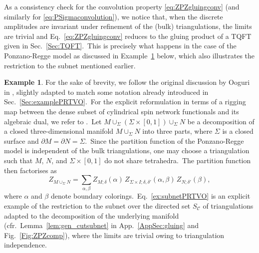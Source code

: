 \documentclass[11pt]{article}
\theoremstyle{definition}
\newtheorem{example}[proposition]{Example}
\numberwithin{equation}{section}
\begin{document}
As a consistency check for the convolution property \eqref{eq:ZPZgluingconv} (and similarly for \eqref{eq:PSigmaconvolution}), we notice that, when the discrete amplitudes are invariant under refinement of the (bulk) triangulations, the limits are trivial and Eq.~\eqref{eq:ZPZgluingconv} reduces to the gluing product of a TQFT given in Sec.~\ref{Sec:TQFT}.~This is precisely what happens in the case of the Ponzano-Regge model as discussed in Example~\ref{Ex:PRTVO2} below, which also illustrates the restriction to the subnet mentioned earlier.

\begin{example}\label{Ex:PRTVO2}
For the sake of brevity, we follow the original discussion by Ooguri in \cite{Ooguri:1991ib,Ooguri_1992a}, slightly adapted to match some notation already introduced in Sec.~\ref{Sec:examplePRTVO}.~For the explicit reformulation in terms of a rigging map between the dense subset of cylindrical spin network functionals and its algebraic dual, we refer to \cite{Noui_Perez_2005}.~Let $M \cup_{\Sigma} (\Sigma\times[0,1]) \cup_{\Sigma} N$ be a decomposition of a closed three-dimensional manifold $M\cup_{\Sigma}N$ into three parts, where $\Sigma$ is a closed surface and $\partial M = \partial N = \Sigma$.~Since the partition function of the Ponzano-Regge model is independent of the bulk triangulations, one may choose a triangulation such that $M$, $N$, and $\Sigma\times[0,1]$ do not share tetrahedra.~The partition function then factorises as
\begin{equation}\label{ex:subnetPRTVO}
Z_{M \cup_{\Sigma} N}=
\sum_{\alpha,\beta}
Z_{M;\delta}(\alpha)\,
Z_{\Sigma\times I;\delta,\delta'}(\alpha,\beta)\,
Z_{N;\delta'}(\beta),
\end{equation}
where $\alpha$ and $\beta$ denote boundary colorings.~Eq.~\eqref{ex:subnetPRTVO} is an explicit example of the restriction to the subnet over the directed set $S_\mathscr{C}$ of triangulations adapted to the decomposition of the underlying manifold (cfr.~Lemma~\ref{lem:gen_cutsubnet} in App.~\ref{AppSec:gluing} and Fig.~\ref{Fig:ZPZcomp}), where the limits are trivial owing to triangulation independence.


\end{example}
\end{document}
